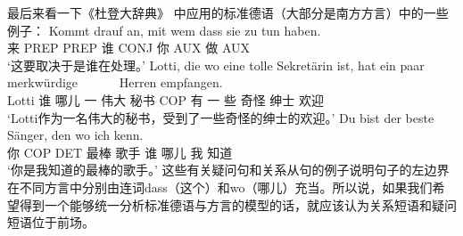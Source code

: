 最后来看一下《杜登大辞典》\citep[§1347]{Duden2005-Authors} 中应用的标准德语（大部分是南方方言）中的一些例子：
\eal
\ex 
\gll Kommt drauf an, mit wem dass sie zu tun haben.\\
     来 PREP \partic{} PREP 谁 CONJ 你 AUX 做 AUX\\
\glt `这要取决于是谁在处理。'
\zl
\eal
\ex 
\gll Lotti, die wo eine tolle Sekretärin ist, hat ein paar merkwürdige~~~~~~ Herren empfangen.\\
     Lotti  谁 哪儿 一 伟大 秘书 COP 有 一 些 奇怪 绅士 欢迎\\
\glt `Lotti作为一名伟大的秘书，受到了一些奇怪的绅士的欢迎。'
\ex 
\gll Du bist der beste Sänger, den wo ich kenn.\\
     你 COP DET 最棒 歌手   谁 哪儿 我 知道\\
\glt `你是我知道的最棒的歌手。'
\zl
这些有关疑问句和关系从句的例子说明句子的左边界在不同方言中分别由连词dass（这个）和wo（哪儿）充当。所以说，如果我们希望得到一个能够统一分析标准德语与方言的模型的话，就应该认为关系短语和疑问短语位于前场。

